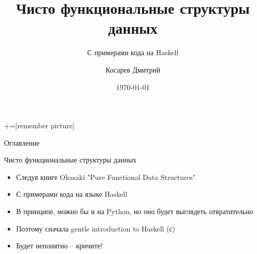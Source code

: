 \documentclass[aspectratio=169
  , xcolor={svgnames}
  , hyperref={ colorlinks,citecolor=DeepPink4
             , linkcolor=DarkRed,urlcolor=DarkBlue}
  , russian
  ]{beamer}
\title[PFDS с примерами на Haskell]{Чисто функциональные структуры данных}
\subtitle{С примерами кода на Haskell}
\author{Косарев Дмитрий }
\institute{матмех СПбГУ}
\date{\today}
\theoremstyle{exerciseStyle1}
\begin{document}
\maketitle

+=[remember picture] 

\everymath{\displaystyle}

\begin{frame}[allowframebreaks]{Оглавление}
  \tableofcontents
\end{frame}

\begin{frame}[fragile]{Чисто функциональные структуры данных}
\begin{itemize}
  \item Следуя книге Okasaki "Pure Functional Data Structures"
  \item С примерами кода на языке Haskell
  \item В принципе, можно бы и на Python, но оно будет выглядеть отвратительно
  \item Поэтому сначала gentle introduction to Haskell (с)
  \item Будет непонятно -- кричите!
\end{itemize}
\end{frame}

{
\begin{frame}
\end{frame}
}
\end{document}
